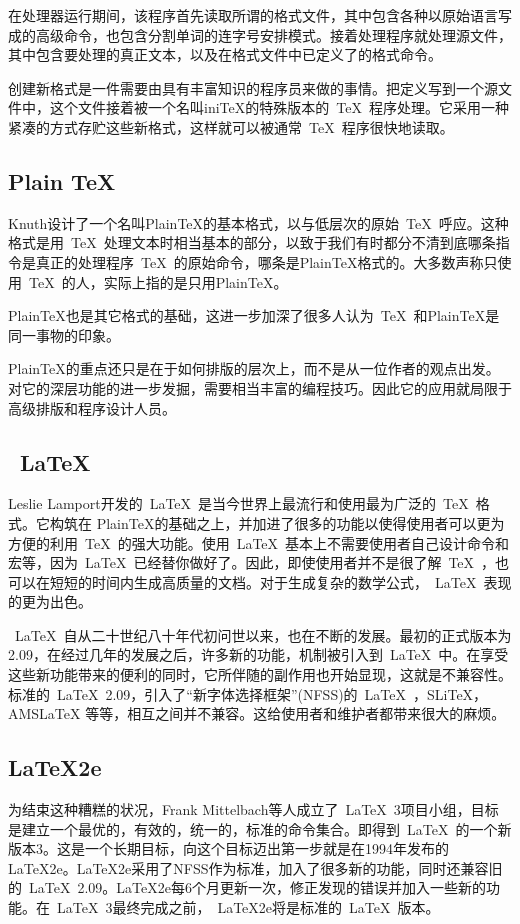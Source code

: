 在处理器运行期间，该程序首先读取所谓的格式文件，其中包含各种以原始语言写成的高级命令，也包含分割单词的连字号安排模式。接着处理程序就处理源文件，其中包含要处理的真正文本，以及在格式文件中已定义了的格式命令。


创建新格式是一件需要由具有丰富知识的程序员来做的事情。把定义写到一个源文件中，这个文件接着被一个名叫iniTeX的特殊版本的~\TeX{}~程序处理。它采用一种紧凑的方式存贮这些新格式，这样就可以被通常~\TeX{}~程序很快地读取。
\subsection{Plain TeX}
Knuth设计了一个名叫PlainTeX的基本格式，以与低层次的原始~\TeX{}~呼应。这种格式是用~\TeX{}~处理文本时相当基本的部分，以致于我们有时都分不清到底哪条指令是真正的处理程序~\TeX{}~的原始命令，哪条是PlainTeX格式的。大多数声称只使用~\TeX{}~的人，实际上指的是只用PlainTeX。


PlainTeX也是其它格式的基础，这进一步加深了很多人认为~\TeX{}~和PlainTeX是同一事物的印象。


PlainTeX的重点还只是在于如何排版的层次上，而不是从一位作者的观点出发。对它的深层功能的进一步发掘，需要相当丰富的编程技巧。因此它的应用就局限于高级排版和程序设计人员。
\subsection{~\LaTeX{}~}
Leslie Lamport开发的~\LaTeX{}~是当今世界上最流行和使用最为广泛的~\TeX{}~格式。它构筑在 PlainTeX的基础之上，并加进了很多的功能以使得使用者可以更为方便的利用~\TeX{}~的强大功能。使用~\LaTeX{}~基本上不需要使用者自己设计命令和宏等，因为~\LaTeX{}~已经替你做好了。因此，即使使用者并不是很了解~\TeX{}~，也可以在短短的时间内生成高质量的文档。对于生成复杂的数学公式，~\LaTeX{}~表现的更为出色。


~\LaTeX{}~自从二十世纪八十年代初问世以来，也在不断的发展。最初的正式版本为 2.09，在经过几年的发展之后，许多新的功能，机制被引入到~\LaTeX{}~中。在享受这些新功能带来的便利的同时，它所伴随的副作用也开始显现，这就是不兼容性。标准的~\LaTeX{}~2.09，引入了“新字体选择框架”(NFSS)的~\LaTeX{}~，SLiTeX，AMSLaTeX 等等，相互之间并不兼容。这给使用者和维护者都带来很大的麻烦。
\subsection{LaTeX2e}
为结束这种糟糕的状况，Frank Mittelbach等人成立了~\LaTeX{}~3项目小组，目标是建立一个最优的，有效的，统一的，标准的命令集合。即得到~\LaTeX{}~的一个新版本3。这是一个长期目标，向这个目标迈出第一步就是在1994年发布的LaTeX2e。LaTeX2e采用了NFSS作为标准，加入了很多新的功能，同时还兼容旧的~\LaTeX{}~2.09。LaTeX2e每6个月更新一次，修正发现的错误并加入一些新的功能。在~\LaTeX{}~3最终完成之前，~LaTeX2e将是标准的~\LaTeX{}~版本。
